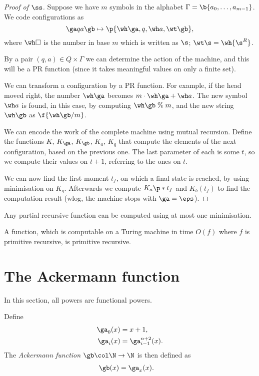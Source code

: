 \begin{proof}[Proof of $\ss$]
  Suppose we have $m$ symbols in the alphabet $\Gamma = \b{a_0, \dots, a_{m-1}}$.
  We code configurations as
  $$ \ga q a \gb \mapsto \p{\wh \ga, q, \wh a, \wt \gb}, $$
  where $\wh \square$ is the number in base $m$ which is written as $\s$; $\wt \s = \wh{\s^R}$.
   
   By a pair $(q, a) \in Q \times \Gamma$ we can determine the action of the machine, and this will be a PR function (since it takes meaningful values on only a finite set).
   
   We can transform a configuration by a PR function. For example, if the head moved right, the number $\wh \ga$ becomes $m \cdot \wh \ga + \wh a$. The new symbol $\wh a$ is found, in this case, by computing $\wh \gb \mathrel{\%} m$, and the new string $\wh \gb$ as $\f{\wh \gb / m}$.
   
   We can encode the work of the complete machine using mutual recursion. Define the functions $K$, $K_\ga$, $K_\gb$, $K_a$, $K_q$ that compute the elements of the next configuration, based on the previous one. The last parameter of each is some $t$, so we compute their values on $t+1$, referring to the ones on $t$.
   
   We can now find the first moment $t_f$, on which a final state is reached, by using minimisation on $K_q$. Afterwards we compute $K_a\p*{t_f}$ and $K_b(t_f)$ to find the computation result (wlog, the machine stops with $\ga = \eps$).
\end{proof}

\begin{corollary}
  Any partial recursive function can be computed using at most one minimisation.
\end{corollary}

\begin{corollary}
  A function, which is computable on a Turing machine in time $O(f)$ where $f$ is primitive recursive, is primitive recursive.
\end{corollary}

\section{The Ackermann function}

In this section, all powers are functional powers.

\begin{definition}
    Define
  \begin{align*}
    \ga_0(x) &= x+1, \\
    \ga_i(x) &= \ga_{i-1}^{n+2}(x).
  \end{align*}
  The \emph{Ackermann function $\gb \col \N \to \N$} is then defined as
  \begin{align*}
    \gb(x) &= \ga_x(x).
  \end{align*}
\end{definition}

